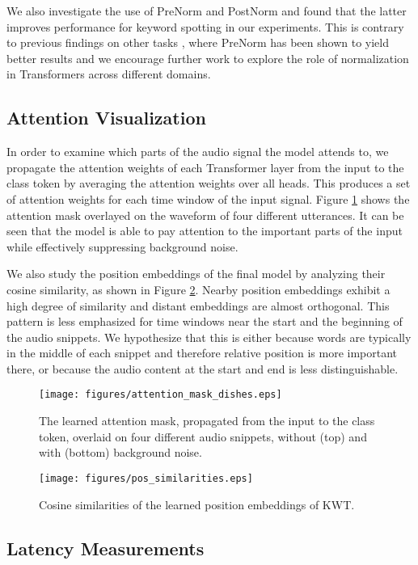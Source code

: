 \documentclass[a4paper]{article}
\begin{document}
We also investigate the use of PreNorm and PostNorm and found that the latter improves performance for keyword spotting in our experiments. This is contrary to previous findings on other tasks \cite{nguyen2019Transformers}, where PreNorm has been shown to yield better results and we encourage further work to explore the role of normalization in Transformers across different domains.

\subsection{Attention Visualization}
In order to examine which parts of the audio signal the model attends to, we propagate the attention weights of each Transformer layer from the input to the class token by averaging the attention weights over all heads. This produces a set of attention weights for each time window of the input signal. Figure \ref{fig:mask} shows the attention mask overlayed on the waveform of four different utterances. It can be seen that the model is able to pay attention to the important parts of the input while effectively suppressing  background noise. 

We also study the position embeddings of the final model by analyzing their cosine similarity, as shown in Figure \ref{fig:pos_similar}. Nearby position embeddings exhibit a high degree of similarity and distant embeddings are almost orthogonal.
This pattern is less emphasized for time windows near the start and the beginning of the audio snippets. We hypothesize that this is either because words are typically in the middle of each snippet and therefore relative position is more important there, or because the audio content at the start and end is less distinguishable.

\begin{figure}[t]
  \centering
  \texttt{[image: figures/attention\_mask\_dishes.eps]}
  \caption{The learned attention mask, propagated from the input to the class token, overlaid on four different audio snippets, without (top) and with (bottom) background noise.}
  \label{fig:mask}
\end{figure}

\begin{figure}[b]
  \centering
  \texttt{[image: figures/pos\_similarities.eps]}
  \caption{Cosine similarities of the learned position embeddings of KWT.}
  \label{fig:pos_similar}
\end{figure}

\subsection{Latency Measurements}
\end{document}
